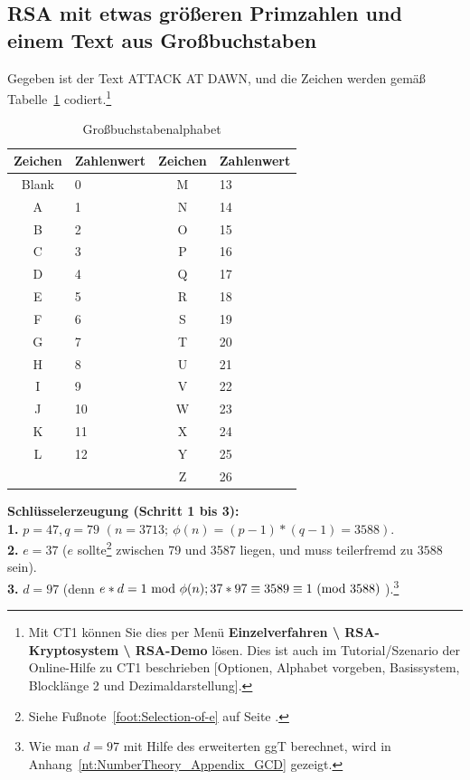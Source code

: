 \begin{refsegment}
\subsection{RSA mit etwas größeren Primzahlen und einem Text aus Großbuchstaben}\label{rsaex2}
Gegeben ist der Text \glqq ATTACK AT DAWN\grqq, und die Zeichen werden gemäß
Tabelle~\ref{alphacode} codiert.\footnote{%
Mit CT1 können Sie dies per Menü
\textbf{Einzelverfahren \textbackslash{} RSA-Kryptosystem \textbackslash{} RSA-Demo} lösen.
Dies ist auch im Tutorial/Szenario der Online-Hilfe zu CT1 beschrieben [Optionen,
Alphabet vorgeben, Basissystem, Blocklänge 2 und Dezimaldarstellung].
}

\begin{table}[ht]
\begin{center}
\begin{tabular}{|c|l||c|l|}
\hline
Zeichen & Zahlenwert & Zeichen & Zahlenwert\\
\hline
\hline
Blank    & 0   & M    & 13\\
A        & 1   & N    & 14\\
B        & 2   & O    & 15\\
C        & 3   & P    & 16\\
D        & 4   & Q    & 17\\
E        & 5   & R    & 18\\
F        & 6   & S    & 19\\
G        & 7   & T    & 20\\
H        & 8   & U    & 21\\
I        & 9   & V    & 22\\
J       & 10   & W    & 23\\
K       & 11   & X    & 24\\
L       & 12   & Y    & 25\\
&              & Z    & 26\\
\hline
\end{tabular}
\end{center}
\hypertarget{Grossbuchstaben-Alphabet}{}
\caption{Großbuchstabenalphabet}
\label{alphacode}
\end{table}

 \textbf{Schlüsselerzeugung (Schritt 1 bis 3):}\\
\textbf{1.} $p=47, q=79$ $( n= 3713;~ \phi(n) = (p-1)*(q-1)=3588).$\\
\textbf{2.} $e=37$ ($e$ sollte\footnote{%
                Siehe Fußnote~\ref{foot:Selection-of-e} auf Seite
                \pageref{foot:Selection-of-e}.}  zwischen 79 und 3587 liegen,
                und muss teilerfremd
                zu $3588$ sein).\\
\textbf{3.} $d=97$ (denn $e*d=1{\rm ~mod~}\phi(n); 37*97 \equiv 3589
\equiv 1{\rm ~(mod~}3588) \;$).\footnote{%
  Wie man $d = 97$ mit Hilfe des erweiterten ggT berechnet, wird in
  Anhang~\ref{nt:NumberTheory_Appendix_GCD} gezeigt.
}


\end{refsegment}
